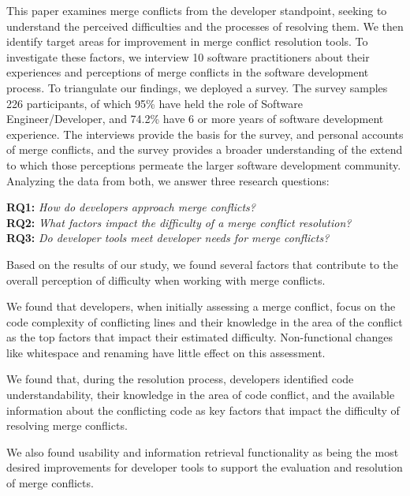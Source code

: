 This paper examines merge conflicts from the developer standpoint, seeking to understand the perceived difficulties and the processes of resolving them.
We then identify target areas for improvement in merge conflict resolution tools.
To investigate these factors, we interview 10 software practitioners about their experiences and perceptions of merge conflicts in the software development process.
To triangulate our findings, we deployed a survey.
The survey samples 226 participants, of which 95\% have held the role of Software Engineer/Developer, and 74.2\% have 6 or more years of software development experience.
The interviews provide the basis for the survey, and personal accounts of merge conflicts, and the survey provides a broader understanding of the extend to which those perceptions permeate the larger software development community.
Analyzing the data from both, we answer three research questions:

\vspace{3px}
\noindent\textbf{RQ1:} \textit{How do developers approach merge conflicts?}\\
\noindent\textbf{RQ2:} \textit{What factors impact the difficulty of a merge conflict resolution?}\\
\noindent\textbf{RQ3:} \textit{Do developer tools meet developer needs for merge conflicts?}
\vspace{3px}

Based on the results of our study, we found several factors that contribute to the overall perception of difficulty when working with merge conflicts.

We found that developers, when initially assessing a merge conflict, focus on the code complexity of conflicting lines and their knowledge in the area of the conflict as the top factors that impact their estimated difficulty.
Non-functional changes like whitespace and renaming have little effect on this assessment. 

We found that, during the resolution process, developers identified code understandability, their knowledge in the area of code conflict, and the available information about the conflicting code as key factors that impact the difficulty of resolving merge conflicts.

We also found usability and information retrieval functionality as being the most desired improvements for developer tools to support the evaluation and resolution of merge conflicts.

